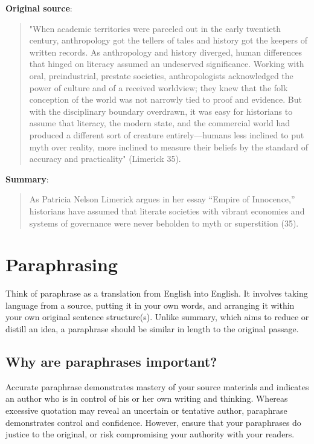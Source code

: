 \textbf{Original source}:
\begin{quote}
"When academic territories were parceled out in the early twentieth century, anthropology got the tellers of tales and history got the keepers of written records.  As anthropology and history diverged, human differences that hinged on literacy assumed an undeserved significance.  Working with oral, preindustrial, prestate societies, anthropologists acknowledged the power of culture and of a received worldview; they knew that the folk conception of the world was not narrowly tied to proof and evidence.  But with the disciplinary boundary overdrawn, it was easy for historians to assume that literacy, the modern state, and the commercial world had produced a different sort of creature entirely—humans less inclined to put myth over reality, more inclined to measure their beliefs by the standard of accuracy and practicality" (Limerick 35).
\end{quote}

\textbf{Summary}:

\begin{quote}
As Patricia Nelson Limerick argues in her essay “Empire of Innocence,” historians have assumed that literate societies with vibrant economies and systems of governance were never beholden to myth or superstition (35).
\end{quote}



\section{Paraphrasing}

Think of paraphrase as a translation from English into English. It involves taking 
language from a source, putting it in your own words, and arranging it within your own original 
sentence structure(s). Unlike summary, which aims to reduce or distill an idea, a paraphrase should 
be similar in length to the original passage.

\subsection{Why are paraphrases important?}

Accurate paraphrase demonstrates mastery of your source materials and indicates an author
who is in control of his or her own writing and thinking. Whereas excessive quotation may reveal
an uncertain or tentative author, paraphrase demonstrates control and confidence. However, 
ensure that your paraphrases do justice to the original, or risk compromising your authority
with your readers.

